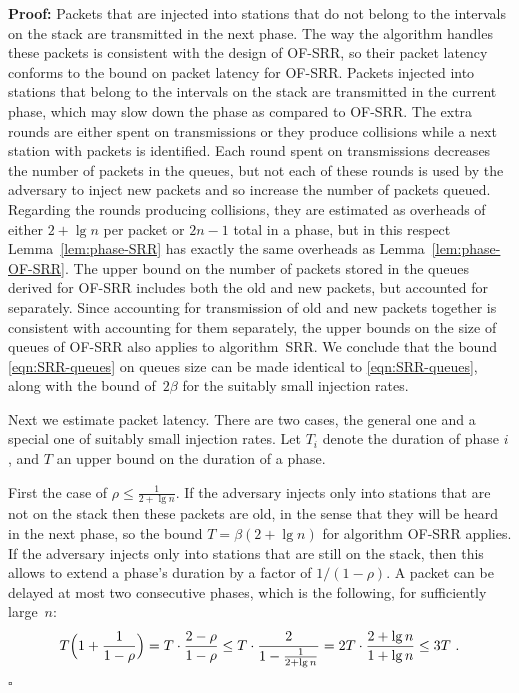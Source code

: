 \documentclass[11pt]{article}
\newcommand{\qed}{\hfill $\square$}
\newenvironment{proof}{\noindent\textbf{Proof: }}{\qed \smallbreak}
\begin{document}
\begin{proof}
Packets that are injected into stations that do not belong to the intervals on the stack are transmitted in the next phase.
The way the algorithm handles these packets is consistent with the design of \textsc{OF-SRR}, so their packet latency conforms to the bound on packet latency for \textsc{OF-SRR}.
Packets injected into stations that belong to the intervals on the stack are transmitted in the current phase, which may slow down the phase as compared to \textsc{OF-SRR}.
The extra rounds are either spent on transmissions or they produce collisions while a next station with packets is identified.
Each round spent on transmissions decreases the number of packets in the queues, but not each of these rounds is used by the adversary to inject new packets and so increase the number of packets queued.
Regarding the rounds producing collisions, they are estimated as overheads of either  $2+\lg n$ per packet or $2n-1$ total in a phase, but in this respect Lemma~\ref{lem:phase-SRR} has exactly the same overheads as Lemma~\ref{lem:phase-OF-SRR}.
The upper bound on the number of packets stored in the queues derived for \textsc{OF-SRR} includes both the old and new packets, but accounted for separately.
Since accounting for transmission of old and new packets together is consistent with accounting for them separately, the upper bounds on the size of queues of \textsc{OF-SRR} also applies to algorithm~\textsc{SRR}.
We conclude that the bound \eqref{eqn:SRR-queues} on queues size can be made identical to \eqref{eqn:SRR-queues}, along  with the bound of~$2\beta$ for the suitably small injection rates.

Next we estimate packet latency.
There are two cases, the general one and a special one of suitably small injection rates.
Let $T_i$ denote the duration of phase $i$, and $T$ an upper bound on the duration of a phase.

First the case of $\rho\le \frac{1}{2+\lg n}$.
If the adversary injects only into stations that are not on the stack then these packets are old, in the sense that they will be heard in the next phase, so the bound $T=  \beta(2+\lg n)$ for algorithm \textsc{OF-SRR} applies.
If the adversary injects only into stations that are still on the stack, then this allows to extend a phase's duration by a factor of $1/(1-\rho)$. 
A packet can be delayed at most two consecutive phases, which is the following, for sufficiently large~$n$:
\[
T\Bigl(1+\frac{1}{1-\rho}\Bigr) 
= T\cdot \frac{2-\rho}{1-\rho}
\le T\cdot\frac{2}{1-\frac{1}{2+\lg n}}
= 2T\cdot\frac{2+\lg n}{1+\lg n}
\le 3T
\ .
\]



\end{proof}
\end{document}
